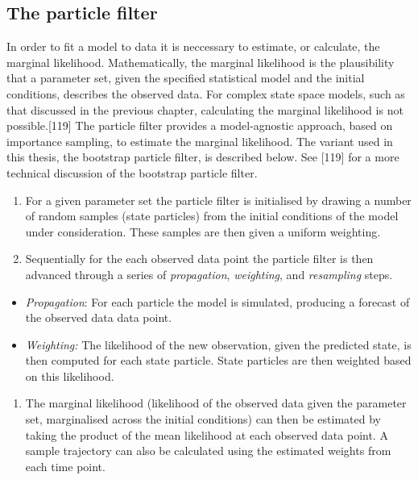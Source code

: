 \documentclass[11pt,twoside]{bristolthesis}
\providecommand{\tightlist}{%
  \setlength{\itemsep}{0pt}\setlength{\parskip}{0pt}}
\begin{document}
  \hypertarget{particle-filter}{%
  \subsection{The particle filter}\label{particle-filter}}
  
  In order to fit a model to data it is neccessary to estimate, or calculate, the marginal likelihood. Mathematically, the marginal likelihood is the plausibility that a parameter set, given the specified statistical model and the initial conditions, describes the observed data. For complex state space models, such as that discussed in the previous chapter, calculating the marginal likelihood is not possible.{[}119{]} The particle filter provides a model-agnostic approach, based on importance sampling, to estimate the marginal likelihood. The variant used in this thesis, the bootstrap particle filter, is described below. See {[}119{]} for a more technical discussion of the bootstrap particle filter.
  \begin{enumerate}
  \def\labelenumi{\arabic{enumi}.}
  \item
    For a given parameter set the particle filter is initialised by drawing a number of random samples (state particles) from the initial conditions of the model under consideration. These samples are then given a uniform weighting.
  \item
    Sequentially for the each observed data point the particle filter is then advanced through a series of \emph{propagation}, \emph{weighting}, and \emph{resampling} steps.
  \end{enumerate}
  \begin{itemize}
  \item
    \emph{Propagation}: For each particle the model is simulated, producing a forecast of the observed data data point.
  \item
    \emph{Weighting:} The likelihood of the new observation, given the predicted state, is then computed for each state particle. State particles are then weighted based on this likelihood.
  \end{itemize}
  \begin{enumerate}
  \def\labelenumi{\arabic{enumi}.}
  \setcounter{enumi}{2}
  \tightlist
  \item
    The marginal likelihood (likelihood of the observed data given the parameter set, marginalised across the initial conditions) can then be estimated by taking the product of the mean likelihood at each observed data point. A sample trajectory can also be calculated using the estimated weights from each time point.
  \end{enumerate}
\end{document}
